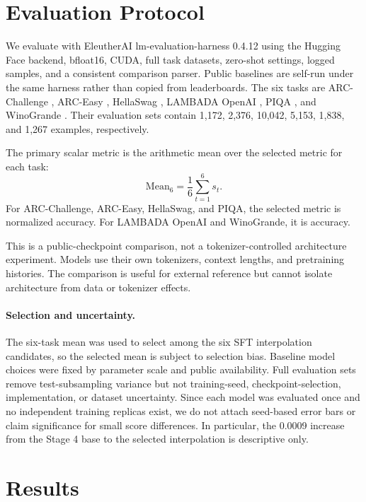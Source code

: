 \documentclass[11pt]{article}
\newcommand{\mean}{\mathrm{Mean}_6}
\begin{document}
\section{Evaluation Protocol}

We evaluate with EleutherAI lm-evaluation-harness 0.4.12 using the Hugging Face backend, bfloat16, CUDA, full task datasets, zero-shot settings, logged samples, and a consistent comparison parser. Public baselines are self-run under the same harness rather than copied from leaderboards. The six tasks are ARC-Challenge \citep{clark2018arc}, ARC-Easy \citep{clark2018arc}, HellaSwag \citep{zellers2019hellaswag}, LAMBADA OpenAI \citep{paperno2016lambada}, PIQA \citep{bisk2019piqa}, and WinoGrande \citep{sakaguchi2019winogrande}. Their evaluation sets contain 1,172, 2,376, 10,042, 5,153, 1,838, and 1,267 examples, respectively.

The primary scalar metric is the arithmetic mean over the selected metric for each task:
\[
  \mean = \frac{1}{6} \sum_{t=1}^{6} s_t .
\]
For ARC-Challenge, ARC-Easy, HellaSwag, and PIQA, the selected metric is normalized accuracy. For LAMBADA OpenAI and WinoGrande, it is accuracy.

This is a public-checkpoint comparison, not a tokenizer-controlled architecture experiment. Models use their own tokenizers, context lengths, and pretraining histories. The comparison is useful for external reference but cannot isolate architecture from data or tokenizer effects.

\paragraph{Selection and uncertainty.}
The six-task mean was used to select among the six SFT interpolation candidates, so the selected mean is subject to selection bias. Baseline model choices were fixed by parameter scale and public availability. Full evaluation sets remove test-subsampling variance but not training-seed, checkpoint-selection, implementation, or dataset uncertainty. Since each model was evaluated once and no independent training replicas exist, we do not attach seed-based error bars or claim significance for small score differences. In particular, the 0.0009 increase from the Stage 4 base to the selected interpolation is descriptive only.

\section{Results}
\end{document}
